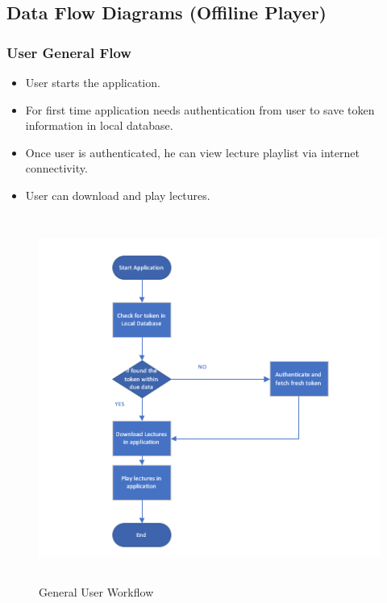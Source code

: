 \documentclass[12pt]{article}
\begin{document}
\subsection{Data Flow Diagrams (Offiline Player)}

\subsubsection{User General Flow}
\begin{itemize}
\item User starts the application.
\item For first time application needs authentication from user to save token information in local database.
\item Once user is authenticated, he can view lecture playlist via internet connectivity.
\item User can download and play lectures.
\end{itemize}

\begin{figure}[h]
\includegraphics[width=12cm, height=12cm]{userworkflow}
\caption{General User Workflow}
\end{figure}
\end{document}
